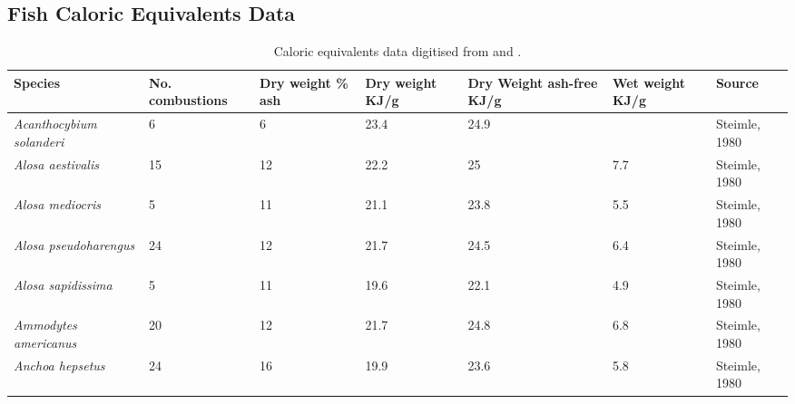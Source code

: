 \documentclass[a4paper]{article} %
\begin{document}
\newpage
\begin{landscape}
\pagestyle{empty}
\section{Fish Caloric Equivalents Data}
\begin{longtable}[]{|l|p{1.8cm}|p{2cm}|p{2cm}|p{2.15cm}|p{1.9cm}|l|}
    \caption{Caloric equivalents data digitised from \textcite{Steimle1980} and \textcite{Cummins1971}.} \\
    \hline
    \textbf{Species}                         & \textbf{No. combustions} & \textbf{Dry weight \% ash} & \textbf{Dry weight KJ/g}     & \textbf{Dry Weight ash-free KJ/g}         & \textbf{Wet weight KJ/g} & \textbf{Source}           \\ \hline
    \textit{Acanthocybium solanderi}         & 6                            & 6                          & 23.4                          & 24.9                              &                          & Steimle, 1980                \\ \hline
    \textit{Alosa aestivalis}                & 15                           & 12                         & 22.2                          & 25                                & 7.7                      & Steimle, 1980                \\ \hline
    \textit{Alosa mediocris}                 & 5                            & 11                         & 21.1                          & 23.8                              & 5.5                      & Steimle, 1980                \\ \hline
    \textit{Alosa pseudoharengus}            & 24                           & 12                         & 21.7                          & 24.5                              & 6.4                      & Steimle, 1980                \\ \hline
    \textit{Alosa sapidissima}               & 5                            & 11                         & 19.6                          & 22.1                              & 4.9                      & Steimle, 1980                \\ \hline
    \textit{Ammodytes americanus}            & 20                           & 12                         & 21.7                          & 24.8                              & 6.8                      & Steimle, 1980                \\ \hline
    \textit{Anchoa hepsetus}                 & 24                           & 16                         & 19.9                          & 23.6                              & 5.8                      & Steimle, 1980                \\ \hline

\end{longtable}
\end{landscape}
\end{document}
